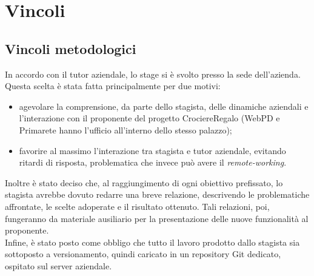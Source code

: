 \section{Vincoli}
\subsection{Vincoli metodologici}
In accordo con il tutor aziendale, lo stage si è svolto presso la sede dell'azienda. Questa scelta è stata fatta principalmente per due motivi:
\begin{itemize}
	\item agevolare la comprensione, da parte dello stagista, delle dinamiche aziendali e l'interazione con il proponente del progetto CrociereRegalo (WebPD e Primarete hanno l'ufficio all'interno dello stesso palazzo);
	\item favorire al massimo l'interazione tra stagista e tutor aziendale, evitando ritardi di risposta, problematica che invece può avere il \textit{remote-working}.
\end{itemize}
Inoltre è stato deciso che, al raggiungimento di ogni obiettivo prefissato, lo stagista avrebbe dovuto redarre una breve relazione, descrivendo le problematiche affrontate, le scelte adoperate e il risultato ottenuto. Tali relazioni, poi, fungeranno da materiale ausiliario per la presentazione delle nuove funzionalità al proponente.\\
Infine, è stato posto come obbligo che tutto il lavoro prodotto dallo stagista sia sottoposto a versionamento, quindi caricato in un repository Git dedicato, ospitato sul server aziendale.

